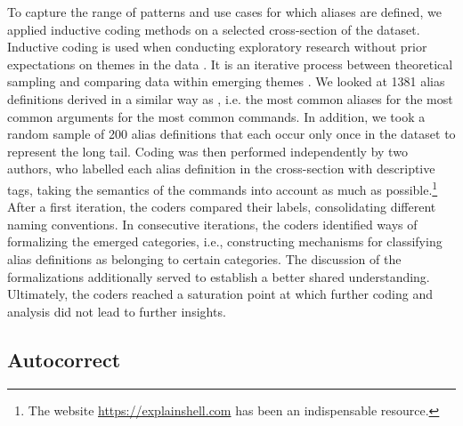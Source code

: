 To capture the range of patterns and use cases for which aliases are defined, we applied inductive coding methods on a selected cross-section of the dataset.
Inductive coding is used when conducting exploratory research without prior expectations on themes in the data \cite{thomas:06}.
It is an iterative process between theoretical sampling and comparing data within emerging themes \cite{dey:03}.
We looked at 1381 alias definitions derived in a similar way as , i.e. the most common aliases for the most common arguments for the most common commands.
In addition, we took a random sample of 200 alias definitions that each occur only once in the dataset to represent the long tail.
Coding was then performed independently by two authors, who labelled each alias definition in the cross-section with descriptive tags, taking the semantics of the commands into account as much as possible.\footnote{The website \url{https://explainshell.com} has been an indispensable resource.}
After a first iteration, the coders compared their labels, consolidating different naming conventions.
In consecutive iterations, the coders identified ways of formalizing the emerged categories, i.e., constructing mechanisms for classifying alias definitions as belonging to certain categories.
The discussion of the formalizations additionally served to establish a better shared understanding.
Ultimately, the coders reached a saturation point at which further coding and analysis did not lead to further insights.


\TODO




%

\subsection{Autocorrect}

